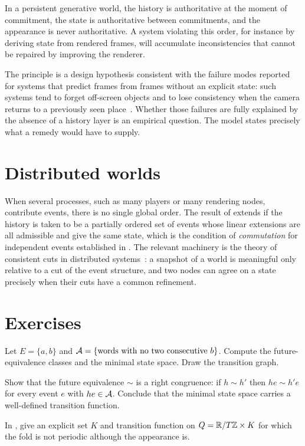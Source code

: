 \begin{principle}\label{pr:authority}
In a persistent generative world, the history is authoritative at the moment of commitment, the state is authoritative between commitments, and the appearance is never authoritative. A system violating this order, for instance by deriving state from rendered frames, will accumulate inconsistencies that cannot be repaired by improving the renderer.
\end{principle}

The principle is a design hypothesis consistent with the failure modes reported for systems that predict frames from frames without an explicit state: such systems tend to forget off-screen objects and to lose consistency when the camera returns to a previously seen place~\cite{bruce2024genie,valevski2024gamengen}. Whether those failures are fully explained by the absence of a history layer is an empirical question. The model states precisely what a remedy would have to supply.

\section{Distributed worlds}

When several processes, such as many players or many rendering nodes, contribute events, there is no single global order. The result of  extends if the history is taken to be a partially ordered set of events whose linear extensions are all admissible and give the same state, which is the condition of \emph{commutation} for independent events established in . The relevant machinery is the theory of consistent cuts in distributed systems~\cite{lamport1978,chandy1985}: a snapshot of a world is meaningful only relative to a cut of the event structure, and two nodes can agree on a state precisely when their cuts have a common refinement.

\section*{Exercises}

\begin{exercise}
Let $E=\{a,b\}$ and $\mathcal{A}=\{\text{words with no two consecutive }b\}$. Compute the future-equivalence classes and the minimal state space. Draw the transition graph.
\end{exercise}

\begin{exercise}
Show that the future equivalence $\sim$ is a right congruence: if $h\sim h'$ then $he\sim h'e$ for every event $e$ with $he\in\mathcal{A}$. Conclude that the minimal state space carries a well-defined transition function.
\end{exercise}

\begin{exercise}
In , give an explicit set $K$ and transition function on $Q=\mathbb{R}/T\mathbb{Z}\times K$ for which the fold is not periodic although the appearance is.
\end{exercise}

